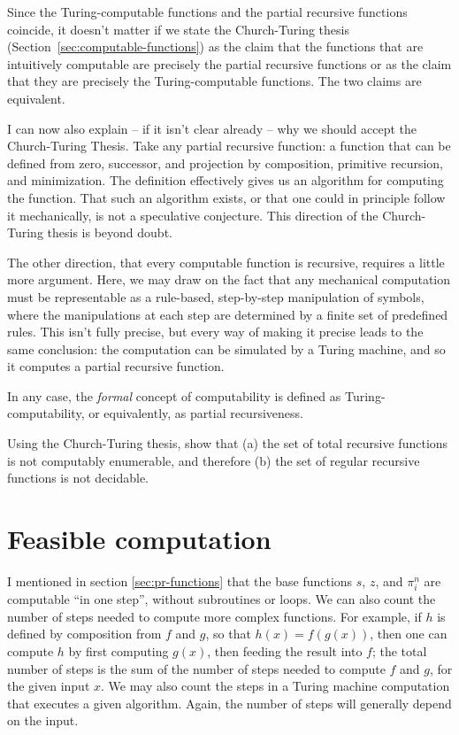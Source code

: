 Since the Turing-computable functions and the partial recursive functions coincide,
it doesn't matter if we state the Church-Turing thesis
(Section~\ref{sec:computable-functions})
as the claim that
the functions that are intuitively computable are precisely the partial recursive functions
or as the claim that they are precisely the Turing-computable functions.
The two claims are equivalent.

I can now also explain -- if it isn't clear already --
why we should accept the Church-Turing Thesis.
Take any partial recursive function:
a function that can be defined from zero, successor, and projection
by composition, primitive recursion, and  minimization.
The definition effectively gives us an algorithm for computing the function.
That such an algorithm exists,
or that one could in principle follow it mechanically,
is not a speculative conjecture.
This direction of the Church-Turing thesis is beyond doubt.

The other direction, that every computable function is recursive,
requires a little more argument.
Here,
we may draw on the fact that
any mechanical computation must be representable as
a rule-based, step-by-step manipulation of symbols,
where the manipulations at each step are determined by a finite set of predefined rules.
This isn't fully precise,
but every way of making it precise leads to the same conclusion:
the computation can be simulated by a Turing machine,
and so it computes a partial recursive function.

In any case,
the \emph{formal} concept of computability is defined as Turing-computability,
or equivalently, as partial recursiveness.

\begin{exercise}
  Using the Church-Turing thesis,
  show that (a) the set of total recursive functions is not computably enumerable, and
  therefore (b) the set of regular recursive functions is not decidable.
\end{exercise}


\section{Feasible computation}

I mentioned in section \ref{sec:pr-functions} that
the base functions $s$, $z$, and $\pi^{n}_{i}$ are computable ``in one step'',
without subroutines or loops.
We can also count the number of steps needed to compute more complex functions.
For example,
if $h$ is defined by composition from $f$ and $g$,
so that $h(x) = f(g(x))$,
then one can compute $h$ by first computing $g(x)$,
then feeding the result into $f$;
the total number of steps is the sum of the number of steps needed to compute $f$ and $g$,
for the given input $x$.
We may also count the steps in a Turing machine computation
that executes a given algorithm.
Again,
the number of steps will generally depend on the input.

